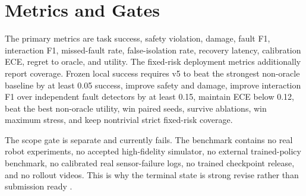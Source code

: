 \documentclass{article}
\begin{document}
\section{Metrics and Gates}
The primary metrics are task success, safety violation, damage, fault F1, interaction F1, missed-fault rate, false-isolation rate, recovery latency, calibration ECE, regret to oracle, and utility. The fixed-risk deployment metrics additionally report coverage. Frozen local success requires v5 to beat the strongest non-oracle baseline by at least 0.05 success, improve safety and damage, improve interaction F1 over independent fault detectors by at least 0.15, maintain ECE below 0.12, beat the best non-oracle utility, win paired seeds, survive ablations, win maximum stress, and keep nontrivial strict fixed-risk coverage.

The scope gate is separate and currently fails. The benchmark contains no real robot experiments, no accepted high-fidelity simulator, no external trained-policy benchmark, no calibrated real sensor-failure logs, no trained checkpoint release, and no rollout videos. This is why the terminal state is strong revise rather than submission ready \citep{liu2025triboelectric77,srivastava2025demystifying78,jung2024learning79,swietlicka2020robot80,lou2023dcyolov881,yang2022topographic82,wang2007robust83,shi2024learning84,alejo2019a85,li2025simultaneous86,imura2002robust87,mahajan2021vayu88,ashokaraj2008robust89,peng2021robust90,zhang2017robust91,shen2022highstretchability92,schreiter2023advantages93,rader2017highly94,teller2008robust95,yue2026lowstrain96}.
\end{document}
